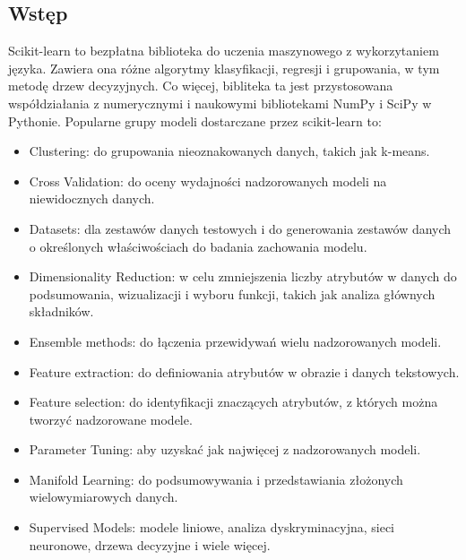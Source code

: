 \documentclass[10pt,a4paper]{article}
\begin{document}
\subsection{Wstęp}
Scikit-learn to bezpłatna biblioteka do uczenia maszynowego z wykorzytaniem języka. Zawiera ona różne algorytmy klasyfikacji, regresji i grupowania, w tym metodę drzew decyzyjnych. Co więcej, bibliteka ta jest przystosowana współdziałania z numerycznymi i naukowymi bibliotekami NumPy i SciPy w Pythonie. Popularne grupy modeli dostarczane przez scikit-learn to:
\begin{itemize}
	\item Clustering: do grupowania nieoznakowanych danych, takich jak k-means.
	\item Cross Validation: do oceny wydajności nadzorowanych modeli na niewidocznych danych.
	\item Datasets: dla zestawów danych testowych i do generowania zestawów danych o określonych właściwościach do badania zachowania modelu.
	\item Dimensionality Reduction: w celu zmniejszenia liczby atrybutów w danych do podsumowania, wizualizacji i wyboru funkcji, takich jak analiza głównych składników.
	\item Ensemble methods: do łączenia przewidywań wielu nadzorowanych modeli.
	\item Feature extraction: do definiowania atrybutów w obrazie i danych tekstowych.
	\item Feature selection: do identyfikacji znaczących atrybutów, z których można tworzyć nadzorowane modele.
	\item Parameter Tuning: aby uzyskać jak najwięcej z nadzorowanych modeli.
	\item Manifold Learning: do podsumowywania i przedstawiania złożonych wielowymiarowych danych.
	\item Supervised Models: modele liniowe, analiza dyskryminacyjna, sieci neuronowe, drzewa decyzyjne i wiele więcej.
\end{itemize}
\end{document}
